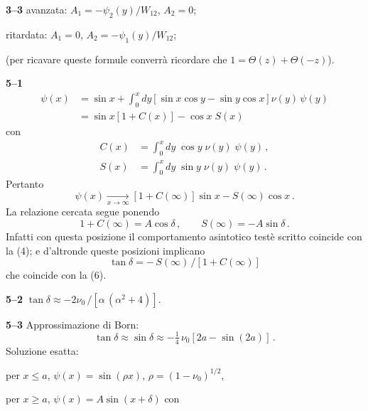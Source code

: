 \documentclass[11pt, a4paper]{book}
\numberwithin{equation}{section}
\begin{document}
\noindent\textbf{3--3} \quad avanzata: $A_1 = -\psi_2(y)/W_{12}$, $A_2 = 0$;

\quad ritardata: $A_1 = 0$, $A_2 = -\psi_1(y)/W_{12}$;

(per ricavare queste formule converrà ricordare che $1 = \Theta(z) + \Theta(-z)$).


\noindent\textbf{5--1}
\begin{align*}
\psi(x) &= \sin x + \int_0^x dy\left[\sin x\cos y - \sin y\cos x\right]\nu(y)\,\psi(y) \\
&= \sin x\left[1 + C(x)\right] - \cos x\; S(x)
\end{align*}
con
\begin{align*}
C(x) &= \int_0^x dy\;\cos y\;\nu(y)\;\psi(y)\,, \\
S(x) &= \int_0^x dy\;\sin y\;\nu(y)\;\psi(y)\,.
\end{align*}
Pertanto
\[
\psi(x) \xrightarrow[x\to\infty]{} \left[1 + C(\infty)\right]\sin x - S(\infty)\cos x\,.
\]
La relazione cercata segue ponendo
\[
1 + C(\infty) = A\cos\delta\,, \qquad S(\infty) = -A\sin\delta\,.
\]
Infatti con questa posizione il comportamento asintotico testè scritto coincide con la (4); e d'altronde queste posizioni implicano
\[
\tan\delta = -\,S(\infty)\,/\left[1 + C(\infty)\right]
\]
che coincide con la (6).

\noindent\textbf{5--2} \quad $\tan\delta \approx -2\nu_0\,/\left[\alpha\,(\alpha^2 + 4)\right]$.

\noindent\textbf{5--3} \quad Approssimazione di Born:
\[
\tan\delta \approx \sin\delta \approx -\tfrac{1}{4}\,\nu_0\left[2a - \sin(2a)\right]\,.
\]
Soluzione esatta:

per $x \leq a$, $\psi(x) = \sin(\rho x)$, $\rho = (1-\nu_0)^{1/2}$,

per $x \geq a$, $\psi(x) = A\sin(x + \delta)$ \quad con

\end{document}
